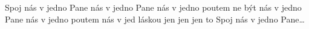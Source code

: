 \begin{TEXT}{Spoj nás v jedno Pane}
\SLOKA[]  nás v jedno Pane  nás v jedno poutem \NL
{} ne být  \NL
{} nás v jedno Pane  nás v jedno poutem \NL
{} nás v jed láskou  
\REFREN  {} jen    jen   \NL
{} jen   to     \NL
Spoj nás v jedno Pane… \NL
\end{TEXT}
